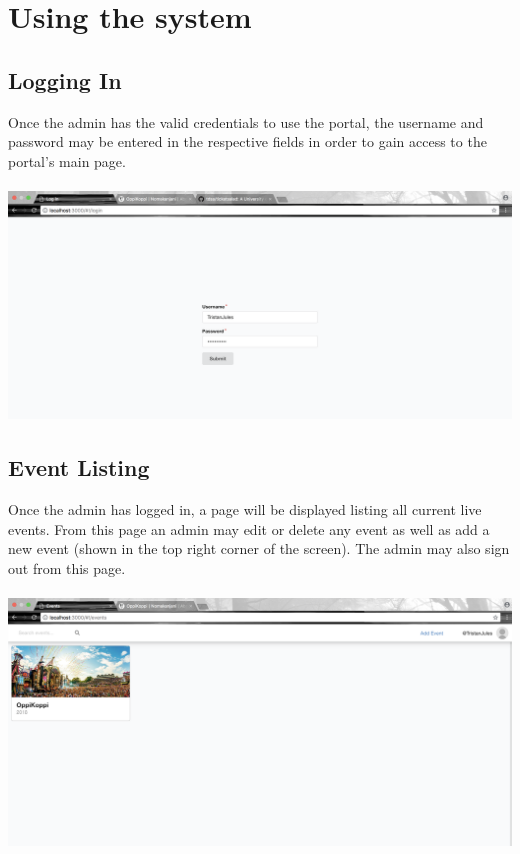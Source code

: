 \documentclass[11pt]{article}
\begin{document}
	\section{Using the system}
	\subsection{Logging In}
	Once the admin has the valid credentials to use the portal, the username and password may be entered in the respective fields in order to gain access to the portal's main page.
	\\
	\\
\includegraphics[width=\linewidth]{login.png}
\pagebreak
	\subsection{Event Listing}
	Once the admin has logged in, a page will be displayed listing all current live events. From this page an admin may edit or delete any event as well as add a new event (shown in the top right corner of the screen). The admin may also sign out from this page.
	\\
	\\
	\includegraphics[width=\linewidth]{home.png}
	\pagebreak
\end{document}
